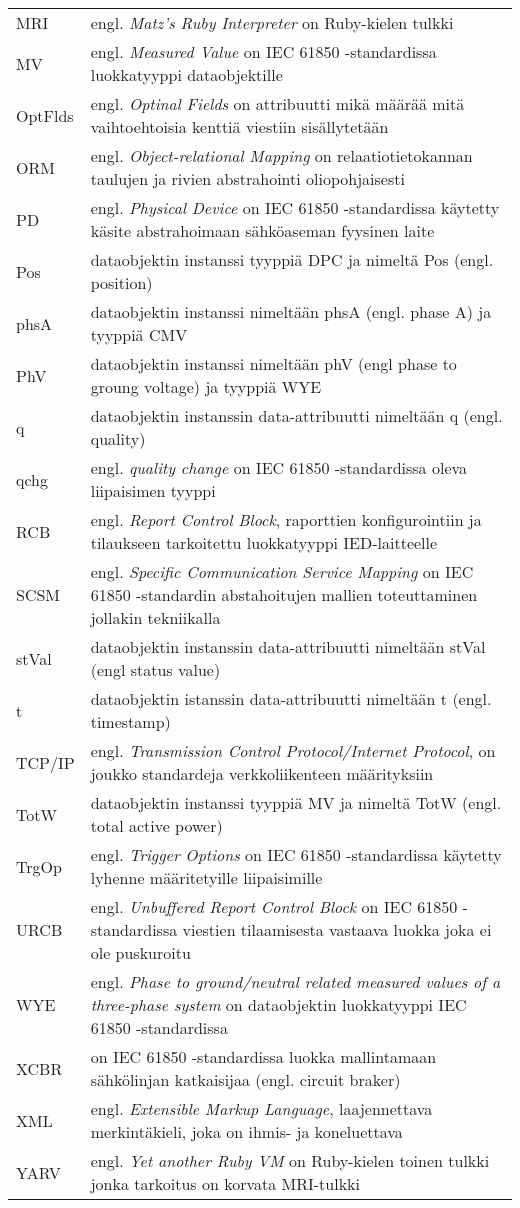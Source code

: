 \begin{tabularx}{\linewidth}[h]{@{} p{} p{} @{}}
	MRI & engl. \emph{Matz’s Ruby Interpreter} on Ruby-kielen tulkki \\
	MV & engl. \emph{Measured Value} on IEC 61850 -standardissa luokkatyyppi dataobjektille \\
	OptFlds & engl. \emph{Optinal Fields} on attribuutti mikä määrää mitä vaihtoehtoisia kenttiä viestiin sisällytetään \\
	ORM & engl. \emph{Object-relational Mapping} on relaatiotietokannan taulujen ja rivien abstrahointi oliopohjaisesti \\
	PD & engl. \emph{Physical Device} on IEC 61850 -standardissa käytetty käsite abstrahoimaan sähköaseman fyysinen laite \\
	Pos & dataobjektin instanssi tyyppiä DPC ja nimeltä Pos (engl. position) \\
	phsA & dataobjektin instanssi nimeltään phsA (engl. phase A) ja tyyppiä CMV \\
	PhV & dataobjektin instanssi nimeltään phV (engl phase to groung voltage) ja tyyppiä WYE \\
	q & dataobjektin instanssin data-attribuutti nimeltään q (engl. quality) \\
	qchg & engl. \emph{quality change} on IEC 61850 -standardissa oleva liipaisimen tyyppi \\
	RCB & engl. \emph{Report Control Block}, raporttien konfigurointiin ja tilaukseen tarkoitettu luokkatyyppi IED-laitteelle \\
	SCSM & engl. \emph{Specific Communication Service Mapping} on IEC 61850 -standardin abstahoitujen mallien toteuttaminen jollakin tekniikalla \\
	stVal & dataobjektin instanssin data-attribuutti nimeltään stVal (engl status value) \\
	t & dataobjektin istanssin data-attribuutti nimeltään t (engl. timestamp) \\
	TCP/IP & engl. \emph{Transmission Control Protocol/Internet Protocol}, on joukko standardeja verkkoliikenteen määrityksiin \\
	TotW & dataobjektin instanssi tyyppiä MV ja nimeltä TotW (engl. total active power) \\
	TrgOp & engl. \emph{Trigger Options} on IEC 61850 -standardissa käytetty lyhenne määritetyille liipaisimille \\
	URCB & engl. \emph{Unbuffered Report Control Block} on IEC 61850 -standardissa viestien tilaamisesta vastaava luokka joka ei ole puskuroitu \\
	WYE & engl. \emph{Phase to ground/neutral related measured values of a three-phase system} on dataobjektin luokkatyyppi IEC 61850 -standardissa \\
	XCBR & on IEC 61850 -standardissa luokka mallintamaan sähkölinjan katkaisijaa (engl. circuit braker) \\
	XML & engl. \emph{Extensible Markup Language}, laajennettava merkintäkieli, joka on ihmis- ja koneluettava \\
	YARV & engl. \emph{Yet another Ruby VM} on Ruby-kielen toinen tulkki jonka tarkoitus on korvata MRI-tulkki \\
\end{tabularx}